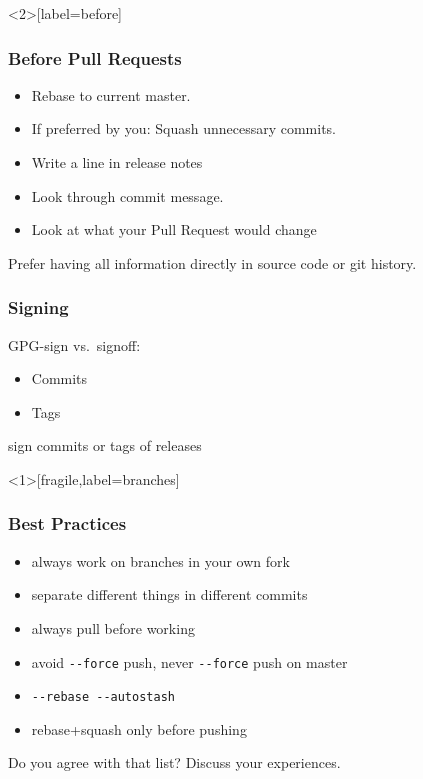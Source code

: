 \begin{frame}<2>[label=before]
	\frametitle{Before Pull Requests}

	\pause

	\begin{itemize}
		\item Rebase to current master.
		\item If preferred by you: Squash unnecessary commits.
		\item Write a line in release notes
		\item Look through commit message.
		\item Look at what your Pull Request would change
	\end{itemize}

	\begin{finding}
	Prefer having all information directly in source code or git history.
	\end{finding}
\end{frame}

\begin{frame}
	\frametitle{Signing}

	GPG-sign vs.\ signoff:
	\begin{itemize}
		\item Commits
		\item Tags
	\end{itemize}

	\begin{finding}
	sign commits or tags of releases
	\end{finding}
\end{frame}

\begin{frame}<1>[fragile,label=branches]
	\frametitle{Best Practices}
	\begin{itemize}
		\item always work on branches in your own fork
		\item separate different things in different commits
		\item always pull before working
		\item avoid \verb+--force+ push, never \verb+--force+ push on master
		\item \verb+--rebase --autostash+
		\item rebase+squash only before pushing
	\end{itemize}

	\pause

	\begin{task}
	Do you agree with that list?
	Discuss your experiences.
	\end{task}
\end{frame}


